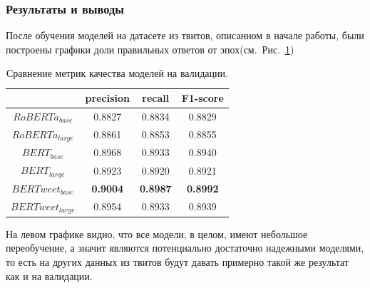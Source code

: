 \documentclass{article}
\begin{document}
\subsubsection{Результаты и выводы}
После обучения моделей на датасете из твитов, описанном в начале работы, были построены графики доли правильных ответов от эпох(см.~Рис.~\ref{eq:models_anal})
\begin{figure}[h]
    \centering
    \caption{}
    \label{eq:models_anal}
\end{figure}

\begin{table}[h!]
    \centering
    \begin{tabular}{|c|c|c|c|}
        \hline
            & precision & recall & F1-score\\
        \hline
            $RoBERTa_{base}$ & 0.8827 &  0.8834 & 0.8829\\
        \hline
            $RoBERTa_{large}$  &  0.8861 & 0.8853 & 0.8855\\
        \hline
            $BERT_{base}$ & 0.8968 &  0.8933 & 0.8940 \\
        \hline
            $BERT_{large}$& 0.8923 & 0.8920 & 0.8921 \\
        \hline
            $BERTweet_{base}$ & \bfseries{0.9004} &  \bfseries{0.8987} & \bfseries{0.8992} \\
        \hline
            $BERTweet_{large}$ & 0.8954 &  0.8933 & 0.8939 \\    
        \hline
    \end{tabular}
    \caption{Сравнение метрик качества моделей на валидации.}
    \label{table:table3}
    \end{table}

На левом графике видно, что все модели, в целом, имеют небольшое переобучение, а значит являются потенциально достаточно надежными моделями, то есть на других данных из твитов будут давать примерно такой же результат как и на валидации.
\end{document}
